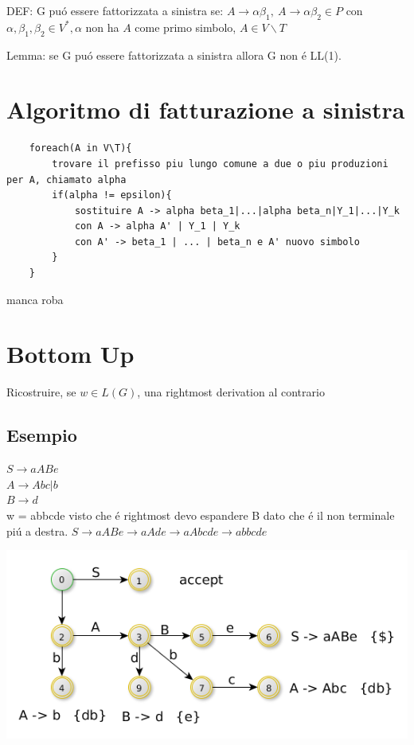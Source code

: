 DEF: G pu\'o essere fattorizzata a sinistra se:
$A \rightarrow \alpha \beta _1,\ A \rightarrow \alpha\beta _2 \in P$ con \\
$\alpha , \beta _1, \beta _2 \in V^*, \alpha $ non ha $A$ come primo simbolo, $A \in V\backslash T$

Lemma: se G pu\'o essere fattorizzata a sinistra allora G non \'e LL(1).

\section{Algoritmo di fatturazione a sinistra}
\begin{lstlisting}
    foreach(A in V\T){
        trovare il prefisso piu lungo comune a due o piu produzioni per A, chiamato alpha 
        if(alpha != epsilon){
            sostituire A -> alpha beta_1|...|alpha beta_n|Y_1|...|Y_k
            con A -> alpha A' | Y_1 | Y_k 
            con A' -> beta_1 | ... | beta_n e A' nuovo simbolo
        }
    }
\end{lstlisting}

manca roba

\section{Bottom Up}
Ricostruire, se $w \in L(G)$, una rightmost derivation al contrario

\subsection{Esempio}
$S \rightarrow aABe$\\
$A \rightarrow Abc|b$\\
$B \rightarrow d$\\

w = abbcde visto che \'e rightmost devo espandere B dato che \'e il non terminale pi\'u a destra.
$S \rightarrow aABe \rightarrow aAde \rightarrow aAbcde \rightarrow abbcde $\\

\begin{center}
    \includegraphics[scale=0.4]{Chapters/Img/c02_14.png}\\
\end{center} 


